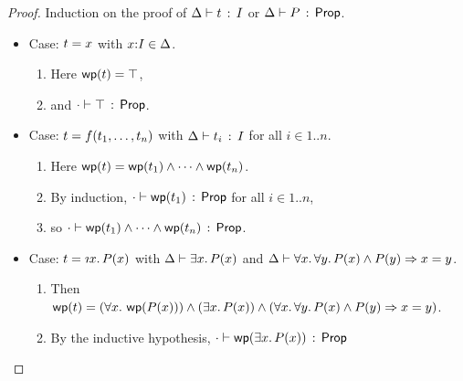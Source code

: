 \documentclass[10pt,letter]{article}
\begin{document}
\begin{proof}
  \raggedright Induction on the proof of
  $\Delta \vdash t\, :\, I$ or $\Delta \vdash P\, :\, \mathsf{Prop}$.
  \begin{itemize}
  \item Case: $t = x$ with $x{:}I\in\Delta$.  
    \begin{enumerate}
      \item
        Here $\mathop{\mathsf{wp}}(t) = \top$,
      \item
        and $\cdot \vdash \top\, :\, \mathsf{Prop}$. 
      \end{enumerate}
  \item Case: $t = f({t}_1,\ldots,{t}_{n})$ with
    $\Delta \vdash t_i\, :\, I$ for all $i\in1..n$.
    \begin{enumerate}
    \item
      Here $\mathop{\mathsf{wp}}(t) =
      \mathop{\mathsf{wp}}(t_1) \wedge \cdots \wedge \mathop{\mathsf{wp}}(t_n)$.
    \item 
    	By induction,
      $\cdot \vdash \mathop{\mathsf{wp}}(t_1)\, :\, \mathsf{Prop}$ for
      all $i\in1..n$, 
    \item 
    	so
    $\cdot \vdash \mathop{\mathsf{wp}}(t_1) \wedge \cdots \wedge \mathop{\mathsf{wp}}(t_n)\, :\, \mathsf{Prop}$.
    \end{enumerate}

\goodbreak        
  \item Case: $\t = \tDesc{\x}{\I}{\p(\x)}$ with
  $\Delta \vdash \exists x.\, P(x)$ and 
  $\Delta \vdash \forall x.\, \forall y.\, P(x) \wedge P(y) \Rightarrow x=y$.

    \begin{enumerate}
      \item 
        Then
        $\mathop{\mathsf{wp}}(t) = 
        (\forall x.\, \mathop{\mathsf{wp}}(P(x))) \wedge (\exists x.\, P(x)) \wedge (\forall x.\, \forall y.\, P(x) \wedge P(y) \Rightarrow x=y)$.
      \item 
        By the inductive hypothesis, $\cdot \vdash \mathop{\mathsf{wp}}(\exists x.\, P(x))\, :\, \mathsf{Prop}$
\bigskip


\end{enumerate}
\end{itemize}
\end{proof}
\end{document}
